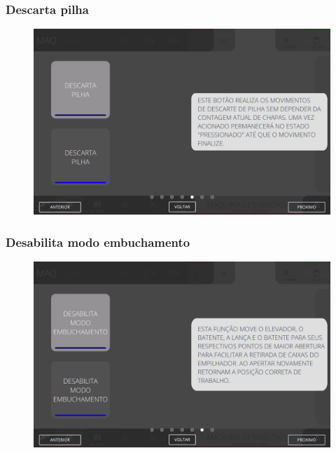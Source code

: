 \newpage
\thispagestyle{fancy}
\vspace*{40 pt}
\subsubsection{\small {Descarta pilha}} \label{sec:telaComandosEmpilhador2DescartaPilha}
\vspace*{\fill}
\begin{figure}[h]
    \centering
    \includegraphics[width=576 px,height=360 px]{src/imagesICV/08-stacker/commands/e-10.png}
\end{figure}
\vspace*{\fill}

\newpage
\thispagestyle{fancy}
\vspace*{40 pt}
\subsubsection{\small {Desabilita modo embuchamento}} \label{sec:telaComandosEmpilhador2DesabilitaModoEmbuchamento}
\vspace*{\fill}
\begin{figure}[h]
    \centering
    \includegraphics[width=576 px,height=360 px]{src/imagesICV/08-stacker/commands/e-11.png}
\end{figure}
\vspace*{\fill}

